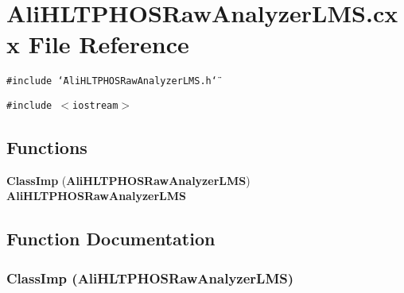 \section{Ali\-HLTPHOSRaw\-Analyzer\-LMS.cxx File Reference}
\label{AliHLTPHOSRawAnalyzerLMS_8cxx}
{\tt \#include \char`\"{}Ali\-HLTPHOSRaw\-Analyzer\-LMS.h\char`\"{}}\par
{\tt \#include $<$iostream$>$}\par
\subsection*{Functions}
\begin{CompactItemize}
\item 
{\bf Class\-Imp} ({\bf Ali\-HLTPHOSRaw\-Analyzer\-LMS}) {\bf Ali\-HLTPHOSRaw\-Analyzer\-LMS}
\end{CompactItemize}


\subsection{Function Documentation}
\subsubsection{\setlength{\rightskip}{0pt plus 5cm}Class\-Imp ({\bf Ali\-HLTPHOSRaw\-Analyzer\-LMS})}\label{AliHLTPHOSRawAnalyzerLMS_8cxx_a0}


